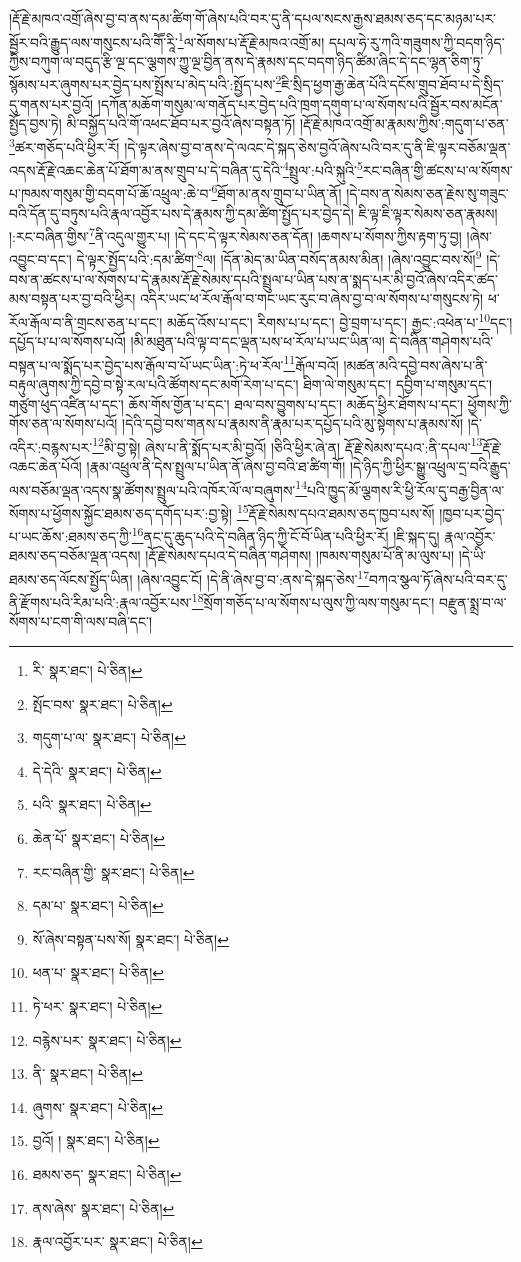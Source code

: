 །རྡོ་རྗེ་མཁའ་འགྲོ་ཞེས་བྱ་བ་ནས་དམ་ཚིག་གོ་ཞེས་པའི་བར་དུ་ནི་དཔལ་སངས་རྒྱས་ཐམས་ཅད་དང་མཉམ་པར་སྦྱོར་བའི་རྒྱུད་ལས་གསུངས་པའི་གཽ་རཱི་\footnote{རི་  སྣར་ཐང་།  པེ་ཅིན། }ལ་སོགས་པ་རྡོ་རྗེ་མཁའ་འགྲོ་མ། དཔལ་ཧེ་རུ་ཀའི་གཟུགས་ཀྱི་བདག་ཉིད་ཀྱིས་བཀུག་ལ་བདུད་རྩི་ལྔ་དང་ལྕགས་ཀྱུ་ལྔ་བྱིན་ནས་དེ་རྣམས་དང་བདག་ཉིད་ཚིམ་ཞིང་དེ་དང་ལྷན་ཅིག་ཏུ་སྙོམས་པར་ཞུགས་པར་བྱེད་པས་སྤྲོས་པ་མེད་པའི་:སྤྱོད་པས་\footnote{སྤོང་བས་  སྣར་ཐང་།  པེ་ཅིན། }ཇི་སྲིད་ཕྱག་རྒྱ་ཆེན་པོའི་དངོས་གྲུབ་ཐོབ་པ་དེ་སྲིད་དུ་གནས་པར་བྱའོ། །དཀོན་མཆོག་གསུམ་ལ་གནོད་པར་བྱེད་པའི་ཁྲག་དགུག་པ་ལ་སོགས་པའི་སྦྱོར་བས་མངོན་སྤྱོད་བྱས་ཏེ། མི་བསྐྱོད་པའི་གོ་འཕང་ཐོབ་པར་བྱའོ་ཞེས་བསྟན་ཏོ། །རྡོ་རྗེ་མཁའ་འགྲོ་མ་རྣམས་ཀྱིས་:གདུག་པ་ཅན་\footnote{གདུག་པ་ལ་  སྣར་ཐང་།  པེ་ཅིན། }ཚར་གཅོད་པའི་ཕྱིར་རོ། །དེ་ལྟར་ཞེས་བྱ་བ་ནས་དེ་ལའང་དེ་སྐད་ཅེས་བྱའོ་ཞེས་པའི་བར་དུ་ནི་ཇི་ལྟར་བཅོམ་ལྡན་འདས་རྡོ་རྗེ་འཆང་ཆེན་པོ་ཐོག་མ་ནས་གྲུབ་པ་དེ་བཞིན་དུ་དེའི་\footnote{དེ་དེའི་  སྣར་ཐང་།  པེ་ཅིན། }སྤྲུལ་:པའི་སྐུའི་\footnote{པའི་  སྣར་ཐང་།  པེ་ཅིན། }རང་བཞིན་གྱི་ཚངས་པ་ལ་སོགས་པ་ཁམས་གསུམ་གྱི་བདག་པོ་ཆོ་འཕྲུལ་:ཆེ་བ་\footnote{ཆེན་པོ་  སྣར་ཐང་།  པེ་ཅིན། }ཐོག་མ་ནས་གྲུབ་པ་ཡིན་ནོ། །དེ་བས་ན་སེམས་ཅན་རྗེས་སུ་གཟུང་བའི་དོན་དུ་བཏུས་པའི་རྣལ་འབྱོར་པས་དེ་རྣམས་ཀྱི་དམ་ཚིག་སྤྱོད་པར་བྱེད་དེ། ཇི་ལྟ་ཇི་ལྟར་སེམས་ཅན་རྣམས། །:རང་བཞིན་གྱིས་\footnote{རང་བཞིན་གྱི་  སྣར་ཐང་།  པེ་ཅིན། }ནི་འདུལ་གྱུར་པ། །དེ་དང་དེ་ལྟར་སེམས་ཅན་དོན། །ཆགས་པ་སོགས་ཀྱིས་རྟག་ཏུ་བྱ། །ཞེས་འབྱུང་བ་དང་། དེ་ལྟར་སྤྱོད་པའི་:དམ་ཚིག་\footnote{དམ་པ་  སྣར་ཐང་།  པེ་ཅིན། }ལ། །དོན་མེད་མ་ཡིན་བསོད་ནམས་མིན། །ཞེས་འབྱུང་བས་སོ།\footnote{སོ་ཞེས་བསྟན་པས་སོ།  སྣར་ཐང་།  པེ་ཅིན། } །དེ་བས་ན་ཚངས་པ་ལ་སོགས་པ་དེ་རྣམས་རྡོ་རྗེ་སེམས་དཔའི་སྤྲུལ་པ་ཡིན་པས་ན་སྨད་པར་མི་བྱའོ་ཞེས་འདིར་ཚད་མས་བསྟན་པར་བྱ་བའི་ཕྱིར། འདིར་ཡང་ཕ་རོལ་རྒོལ་བ་གང་ཡང་རུང་བ་ཞེས་བྱ་བ་ལ་སོགས་པ་གསུངས་ཏེ། ཕ་རོལ་རྒོལ་བ་ནི་གྲངས་ཅན་པ་དང་། མཆོད་འོས་པ་དང་། རིགས་པ་པ་དང་། བྱེ་བྲག་པ་དང་། རྒྱང་:འཕེན་པ་\footnote{ཕན་པ་  སྣར་ཐང་།  པེ་ཅིན། }དང་། དཔྱོད་པ་པ་ལ་སོགས་པའོ། །མི་མཐུན་པའི་ལྟ་བ་དང་ལྡན་པས་ཕ་རོལ་པ་ཡང་ཡིན་ལ། དེ་བཞིན་གཤེགས་པའི་བསྟན་པ་ལ་སྨོད་པར་བྱེད་པས་རྒོལ་བ་པོ་ཡང་ཡིན་:ཏེ་ཕ་རོལ་\footnote{ཏེ་ཕར་  སྣར་ཐང་།  པེ་ཅིན། }རྒོལ་བའོ། །མཚན་མའི་དབྱེ་བས་ཞེས་པ་ནི་བརྟུལ་ཞུགས་ཀྱི་དབྱེ་བ་སྟེ་རལ་པའི་ཚོགས་དང་མགོ་རེག་པ་དང་། ཐིག་ལེ་གསུམ་དང་། དབྱིག་པ་གསུམ་དང་། གཙུག་ཕུད་འཛིན་པ་དང་། ཆོས་གོས་གྱོན་པ་དང་། ཐལ་བས་བྱུགས་པ་དང་། མཆོད་ཕྱིར་ཐོགས་པ་དང་། ཕྱོགས་ཀྱི་གོས་ཅན་ལ་སོགས་པའོ། །དེའི་དབྱེ་བས་གནས་པ་རྣམས་ནི་རྣམ་པར་དཔྱོད་པའི་མུ་སྟེགས་པ་རྣམས་སོ། །དེ་འདིར་:བརྙས་པར་\footnote{བརྙེས་པར་  སྣར་ཐང་།  པེ་ཅིན། }མི་བྱ་སྟེ། ཞེས་པ་ནི་སྨོད་པར་མི་བྱའོ། །ཅིའི་ཕྱིར་ཞེ་ན། རྡོ་རྗེ་སེམས་དཔའ་:ནི་དཔལ་\footnote{ནི་  སྣར་ཐང་།  པེ་ཅིན། }རྡོ་རྗེ་འཆང་ཆེན་པོའོ། །རྣམ་འཕྲུལ་ནི་དེས་སྤྲུལ་པ་ཡིན་ནོ་ཞེས་བྱ་བའི་ཐ་ཚིག་གོ། །དེ་ཉིད་ཀྱི་ཕྱིར་སྒྱུ་འཕྲུལ་དྲ་བའི་རྒྱུད་ལས་བཅོམ་ལྡན་འདས་སྣ་ཚོགས་སྤྲུལ་པའི་འཁོར་ལོ་ལ་བཞུགས་\footnote{ཞུགས་  སྣར་ཐང་།  པེ་ཅིན། }པའི་ཁྱུད་མོ་ལྕགས་རི་ཕྱི་རོལ་དུ་བརྒྱ་བྱིན་ལ་སོགས་པ་ཕྱོགས་སྐྱོང་ཐམས་ཅད་དགོད་པར་:བྱ་སྟེ། \footnote{བྱའོ། །   སྣར་ཐང་།  པེ་ཅིན། }རྡོ་རྗེ་སེམས་དཔའ་ཐམས་ཅད་ཁྱབ་པས་སོ། །ཁྱབ་པར་བྱེད་པ་ཡང་ཆོས་:ཐམས་ཅད་ཀྱི་\footnote{ཐམས་ཅད་  སྣར་ཐང་།  པེ་ཅིན། }ནང་དུ་ཆུད་པའི་དེ་བཞིན་ཉིད་ཀྱི་ངོ་བོ་ཡིན་པའི་ཕྱིར་རོ། །ཇི་སྐད་དུ། རྣལ་འབྱོར་ཐམས་ཅད་བཅོམ་ལྡན་འདས། །རྡོ་རྗེ་སེམས་དཔའ་དེ་བཞིན་གཤེགས། །ཁམས་གསུམ་པོ་ནི་མ་ལུས་པ། །དེ་ཡི་ཐམས་ཅད་ལོངས་སྤྱོད་ཡིན། །ཞེས་འབྱུང་ངོ། །དེ་ནི་ཞེས་བྱ་བ་:ནས་དེ་སྐད་ཅེས་\footnote{ནས་ཞེས་  སྣར་ཐང་།  པེ་ཅིན། }བཀའ་སྩལ་ཏོ་ཞེས་པའི་བར་དུ་ནི་རྫོགས་པའི་རིམ་པའི་:རྣལ་འབྱོར་པས་\footnote{རྣལ་འབྱོར་པར་  སྣར་ཐང་།  པེ་ཅིན། }སྲོག་གཅོད་པ་ལ་སོགས་པ་ལུས་ཀྱི་ལས་གསུམ་དང་། བརྫུན་སྨྲ་བ་ལ་སོགས་པ་ངག་གི་ལས་བཞི་དང་། 